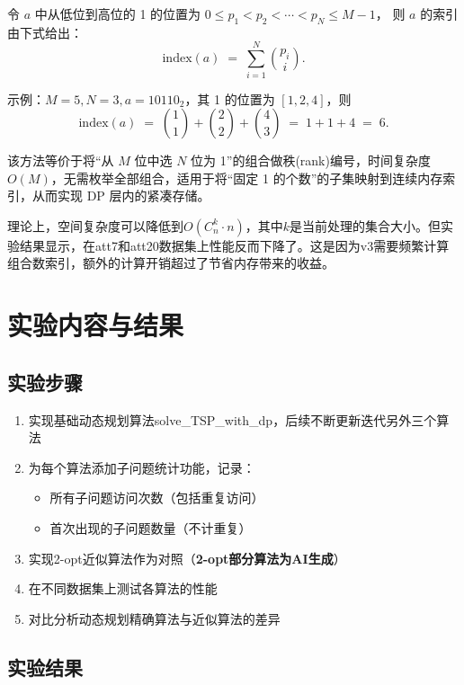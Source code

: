 \documentclass[UTF8,12pt,a4paper]{ctexart}
\begin{document}
\begin{enumerate}
	令 $a$ 中从低位到高位的 1 的位置为
	$0 \le p_1 < p_2 < \cdots < p_N \le M-1$，
	则 $a$ 的索引由下式给出：
	\begin{equation}
	\mathrm{index}(a) \;=\; \sum_{i=1}^{N} \binom{p_i}{i}.
	\end{equation}

	\noindent 示例：$M=5, N=3, a=10110_2$，其 1 的位置为 $[1,2,4]$，则
	\[
	\mathrm{index}(a) \;=\; \binom{1}{1}+\binom{2}{2}+\binom{4}{3}\;=\;1+1+4\;=\;6.
	\]

	该方法等价于将“从 $M$ 位中选 $N$ 位为 1”的组合做秩(rank)编号，时间复杂度 $O(M)$，无需枚举全部组合，适用于将“固定 1 的个数”的子集映射到连续内存索引，从而实现 DP 层内的紧凑存储。

	理论上，空间复杂度可以降低到$O(C_n^k \cdot n)$，其中$k$是当前处理的集合大小。但实验结果显示，在att7和att20数据集上性能反而下降了。这是因为v3需要频繁计算组合数索引，额外的计算开销超过了节省内存带来的收益。
\end{enumerate}

\newpage
\section{实验内容与结果}

\subsection{实验步骤}

\begin{enumerate}
	\item 实现基础动态规划算法solve\_TSP\_with\_dp，后续不断更新迭代另外三个算法
	\item 为每个算法添加子问题统计功能，记录：
	\begin{itemize}
		\item 所有子问题访问次数（包括重复访问）
		\item 首次出现的子问题数量（不计重复）
	\end{itemize}
	\item 实现2-opt近似算法作为对照（\textbf{2-opt部分算法为AI生成}）
	\item 在不同数据集上测试各算法的性能
	\item 对比分析动态规划精确算法与近似算法的差异
\end{enumerate}

\subsection{实验结果}
\end{document}
